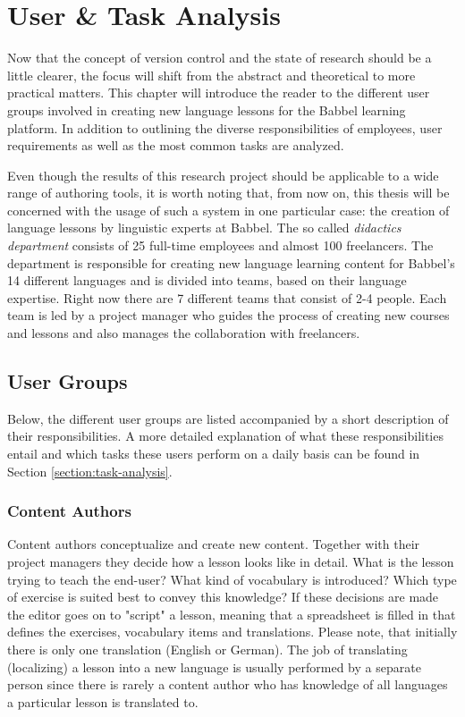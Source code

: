 \chapter{User \& Task Analysis} \label{chapter:user-research}
Now that the concept of version control and the state of research should be a little clearer, the focus will shift from the abstract and theoretical to more practical matters. This chapter will introduce the reader to the different user groups involved in creating new language lessons for the Babbel learning platform. In addition to outlining the diverse responsibilities of employees, user requirements as well as the most common tasks are analyzed.

Even though the results of this research project should be applicable to a wide range of authoring tools, it is worth noting that, from now on, this thesis will be concerned with the usage of such a system in one particular case: the creation of language lessons by linguistic experts at Babbel. The so called \textit{didactics department} consists of 25 full-time employees and almost 100 freelancers. The department is responsible for creating new language learning content for Babbel's 14 different languages and is divided into teams, based on their language expertise. Right now there are 7 different teams that consist of 2-4 people. Each team is led by a project manager who guides the process of creating new courses and lessons and also manages the collaboration with freelancers.

\section{User Groups}
Below, the different user groups are listed accompanied by a short description of their responsibilities. A more detailed explanation of what these responsibilities entail and which tasks these users perform on a daily basis can be found in Section \ref{section:task-analysis}.

\subsection{Content Authors}
Content authors conceptualize and create new content. Together with their project managers they decide how a lesson looks like in detail. What is the lesson trying to teach the end-user? What kind of vocabulary is introduced? Which type of exercise is suited best to convey this knowledge? If these decisions are made the editor goes on to "script" a lesson, meaning that a spreadsheet is filled in that defines the exercises, vocabulary items and translations. Please note, that initially there is only one translation (English or German). The job of translating (localizing) a lesson into a new language is usually performed by a separate person since there is rarely a content author who has knowledge of all languages a particular lesson is translated to.

